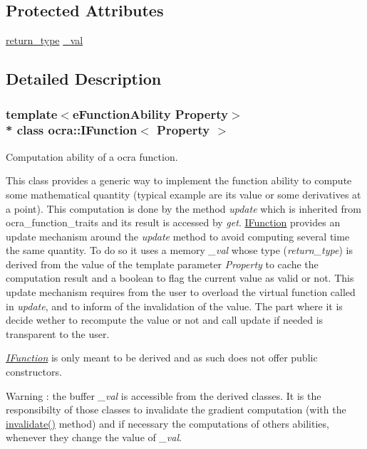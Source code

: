 \subsection*{Protected Attributes}
\begin{DoxyCompactItemize}
\item 
\hyperlink{classocra_1_1IFunction_a04d351c2f938d01046328b54fb7e6525}{return\+\_\+type} \hyperlink{classocra_1_1IFunction_a0796c853731943530bc6c772035dca0a}{\+\_\+val}
\end{DoxyCompactItemize}


\subsection{Detailed Description}
\subsubsection*{template$<$e\+Function\+Ability Property$>$\\*
class ocra\+::\+I\+Function$<$ Property $>$}

Computation ability of a ocra function. 

This class provides a generic way to implement the function ability to compute some mathematical quantity (typical example are its value or some derivatives at a point). This computation is done by the method {\itshape update} which is inherited from ocra\+\_\+function\+\_\+traits and its result is accessed by {\itshape get}. \hyperlink{classocra_1_1IFunction}{I\+Function} provides an update mechanism around the {\itshape update} method to avoid computing several time the same quantity. To do so it uses a memory {\itshape \+\_\+val} whose type ({\itshape return\+\_\+type}) is derived from the value of the template parameter {\itshape Property} to cache the computation result and a boolean to flag the current value as valid or not. This update mechanism requires from the user to overload the virtual function called in {\itshape update}, and to inform of the invalidation of the value. The part where it is decide wether to recompute the value or not and call update if needed is transparent to the user.

{\itshape \hyperlink{classocra_1_1IFunction}{I\+Function}} is only meant to be derived and as such does not offer public constructors.

\begin{DoxyWarning}{Warning}
\+: the buffer {\itshape \+\_\+val} is accessible from the derived classes. It is the responsibilty of those classes to invalidate the gradient computation (with the {\ttfamily \hyperlink{classocra_1_1IFunction_ae7cc0015416e006ad5682e7980f9c3d8}{invalidate()}} method) and if necessary the computations of others abilities, whenever they change the value of {\itshape \+\_\+val}. 
\end{DoxyWarning}


